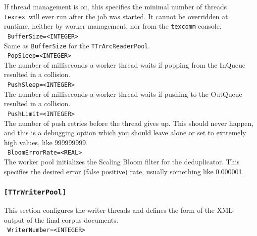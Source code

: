 \documentclass[12pt,a4paper]{article}
\newcommand{\trthis}{\texttt{texrex}}
\begin{document}
If thread management is on, this specifies the minimal number of threads \trthis\ will ever run after the job was started.
It cannot be overridden at runtime, neither by worker management, nor from the \texttt{texcomm} console.\\

\noindent\textbullet~\texttt{BufferSize=<INTEGER>}\\

Same as \texttt{BufferSize} for the \texttt{TTrArcReaderPool}.\\

\noindent\textbullet~\texttt{PopSleep=<INTEGER>}\\

The number of milliseconds a worker thread waits if popping from the InQueue resulted in a collision.\\

\noindent\textbullet~\texttt{PushSleep=<INTEGER>}\\

The number of milliseconds a worker thread waits if pushing to the OutQueue resulted in a collision.\\

\noindent\textbullet~\texttt{PushLimit=<INTEGER>}\\

The number of push retries before the thread gives up.
This should never happen, and this is a debugging option which you should leave alone or set to extremely high values, like 999999999.\\

\noindent\textbullet~\texttt{BloomErrorRate=<REAL>}\\

The worker pool initializes the Scaling Bloom filter for the deduplicator.
This specifies the desired error (false positive) rate, usually something like 0.000001.\\


\subsubsection{\texttt{[TTrWriterPool]}}
\label{sec:writerpool}

This section configures the writer threads and defines the form of the XML output of the final corpus documents.\\

\noindent\textbullet~\texttt{WriterNumber=<INTEGER>}\\
\end{document}
